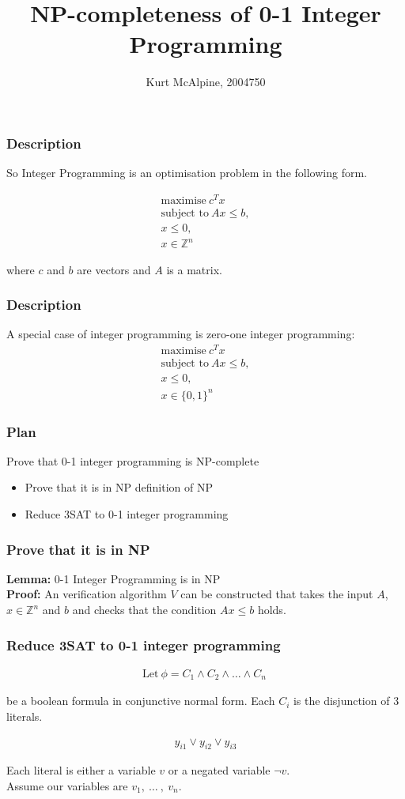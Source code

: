 \documentclass[mathserif]{beamer}
\title{NP-completeness of 0-1 Integer Programming}
\author{Kurt McAlpine, 2004750}
\begin{document}
\frame{\titlepage}

\begin{frame}
\frametitle{Description}
So Integer Programming is an optimisation problem in the following form.

\begin{align*}
\text{maximise}\ c^Tx\\
\text{subject to}\ Ax \leq b,\\
x \leq 0,\\
x \in \mathbb{Z}^n
\end{align*}

where $c$ and $b$ are vectors and $A$ is a matrix.

\end{frame}

\begin{frame}
\frametitle{Description}
A special case of integer programming is zero-one integer programming:
\begin{align*}
\text{maximise}\ c^Tx\\
\text{subject to}\ Ax \leq b,\\
x \leq 0,\\
x \in \{0, 1\}^n
\end{align*}
\end{frame}

\begin{frame}
\frametitle{Plan}
Prove that 0-1 integer programming is NP-complete
\begin{itemize}
\item Prove that it is in NP definition of NP
\item Reduce 3SAT to 0-1 integer programming
\end{itemize}
\end{frame}

\begin{frame}
\frametitle{Prove that it is in NP}
\textbf{Lemma:} 0-1 Integer Programming is in NP\\
\textbf{Proof:} An verification algorithm $V$ can be constructed that takes the input $A$, $x \in \mathbb{Z}^n$ and $b$
and checks that the condition $Ax \leq b$ holds.
\end{frame}

\begin{frame}
\frametitle{Reduce 3SAT to 0-1 integer programming}
\begin{align*}
\text{Let}\ \phi = C_1 \wedge C_2 \wedge \ldots \wedge C_n\
\end{align*}
\begin{center}
be a boolean formula in conjunctive normal form. Each $C_i$ is the disjunction of 3 literals.
\end{center}
\begin{align*}
y_{i1} \vee y_{i2} \vee y_{i3}
\end{align*}

\begin{center}
Each literal is either a variable $v$ or a negated variable $\neg v$.\\

Assume our variables are $v_1,\ \ldots\ ,\ v_n$.
\end{center}

\end{frame}
\end{document}
